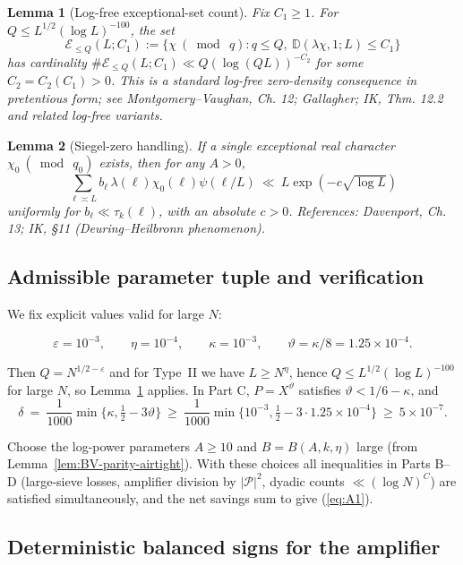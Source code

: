 \documentclass[11pt]{article}
\def\eqref#1{(\ref{#1})}%
\newtheorem{lemma}{Lemma}[part]
\theoremstyle{definition}
\theoremstyle{remark}
\numberwithin{equation}{part}
\begin{document}
\begin{lemma}[Log-free exceptional-set count]\label{lem:logfree-density}
	Fix $C_1\ge 1$. For $Q\le L^{1/2}(\log L)^{-100}$, the set
	\[
		\mathcal E_{\le Q}(L;C_1):=\{\chi\ (\bmod\ q): q\le Q,\ \mathbb D(\lambda\chi,1;L)\le C_1\}
	\]
	has cardinality $\#\mathcal E_{\le Q}(L;C_1)\ll Q(\log (QL))^{-C_2}$ for some $C_2=C_2(C_1)>0$. This is a standard log-free zero-density consequence in pretentious form; see Montgomery--Vaughan, Ch. 12; Gallagher; IK, Thm. 12.2 and related log-free variants.
\end{lemma}

\begin{lemma}[Siegel-zero handling]\label{lem:siegel}
	If a single exceptional real character $\chi_0\ (\bmod\ q_0)$ exists, then for any $A>0$,
	\[
		\sum_{\ell\asymp L} b_\ell\,\lambda(\ell)\chi_0(\ell)\psi(\ell/L)\ \ll\ L\exp(-c\sqrt{\log L})
	\]
	uniformly for $b_\ell\ll \tau_k(\ell)$, with an absolute $c>0$. References: Davenport, Ch. 13; IK, §11 (Deuring--Heilbronn phenomenon).
\end{lemma}

\subsection{Admissible parameter tuple and verification}

We fix explicit values valid for large $N$:

\[
	\varepsilon=10^{-3},\qquad \eta=10^{-4},\qquad \kappa=10^{-3},\qquad \vartheta=\kappa/8=1.25\times 10^{-4}.
\]

Then $Q=N^{1/2-\varepsilon}$ and for Type~II we have $L\ge N^{\eta}$, hence $Q\le L^{1/2}(\log L)^{-100}$ for large $N$, so Lemma~\ref{lem:logfree-density} applies. In Part C, $P=X^{\vartheta}$ satisfies $\vartheta<1/6-\kappa$, and
\[
	\delta\ =\ \frac1{1000}\min\{\kappa,\tfrac12-3\vartheta\}\ \ge\ \frac{1}{1000}\min\{10^{-3},\tfrac12-3\cdot 1.25\times 10^{-4}\}\ \ge\ 5\times 10^{-7}.
\]

Choose the log-power parameters $A\ge 10$ and $B=B(A,k,\eta)$ large (from Lemma~\ref{lem:BV-parity-airtight}). With these choices all inequalities in Parts B--D (large-sieve losses, amplifier division by $|\mathcal P|^2$, dyadic counts $\ll (\log N)^C$) are satisfied simultaneously, and the net savings sum to give \eqref{eq:A1}.

\subsection{Deterministic balanced signs for the amplifier}
\end{document}
